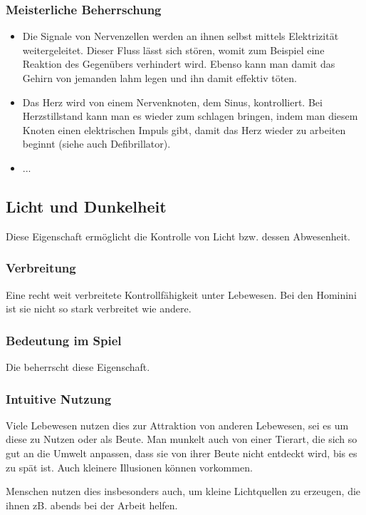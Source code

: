 \subsubsection{Meisterliche Beherrschung} 
\begin{itemize}
	\item Die Signale von Nervenzellen werden an ihnen selbst mittels Elektrizität weitergeleitet. Dieser Fluss lässt sich stören, womit zum Beispiel eine Reaktion des Gegenübers verhindert wird. Ebenso kann man damit das Gehirn von jemanden lahm legen und ihn damit effektiv töten.
	\item Das Herz wird von einem Nervenknoten, dem Sinus, kontrolliert. Bei Herzstillstand kann man es wieder zum schlagen bringen, indem man diesem Knoten einen elektrischen Impuls gibt, damit das Herz wieder zu arbeiten beginnt (siehe auch Defibrillator).
	\item ...
\end{itemize}




\subsection{Licht und Dunkelheit} \label{sec:lichtmagie}
Diese Eigenschaft ermöglicht die Kontrolle von Licht bzw. dessen Abwesenheit.

\subsubsection{Verbreitung}
Eine recht weit verbreitete Kontrollfähigkeit unter Lebewesen. Bei den Hominini ist sie nicht so stark verbreitet wie andere.

\subsubsection{Bedeutung im Spiel}
Die  beherrscht diese Eigenschaft. 


\subsubsection{Intuitive Nutzung}
Viele Lebewesen nutzen dies zur Attraktion von anderen Lebewesen, sei es um diese zu Nutzen oder als Beute. Man munkelt auch von einer Tierart, die sich so gut an die Umwelt anpassen, dass sie von ihrer Beute nicht entdeckt wird, bis es zu spät ist. Auch kleinere Illusionen können vorkommen.

Menschen nutzen dies insbesonders auch, um kleine Lichtquellen zu erzeugen, die ihnen zB. abends bei der Arbeit helfen.

